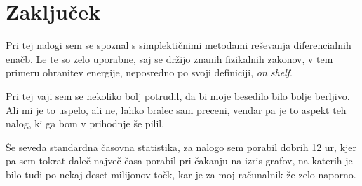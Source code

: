 \documentclass{porocilo}
\begin{document}


\newpage
\section{Zaključek}
Pri tej nalogi sem se spoznal s simplektičnimi metodami reševanja diferencialnih enačb. Le te so zelo uporabne, saj se držijo znanih fizikalnih zakonov, v tem primeru ohranitev energije, neposredno po svoji definiciji, \textit{on shelf}.

Pri tej vaji sem se nekoliko bolj potrudil, da bi moje besedilo bilo bolje berljivo. Ali mi je to uspelo, ali ne, lahko bralec sam preceni, vendar pa je to aspekt teh nalog, ki ga bom v prihodnje še pilil.

Še seveda standardna časovna statistika, za nalogo sem porabil dobrih 12 ur, kjer pa sem tokrat daleč največ časa porabil pri čakanju na izris grafov, na katerih je bilo tudi po nekaj deset milijonov točk, kar je za moj računalnik že zelo naporno.
\end{document}
